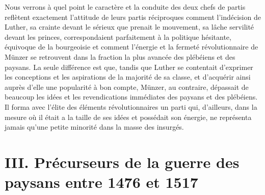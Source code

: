 \documentclass[french,twoside]{book} %
\newcommand\chapteropen{} %
\newcommand\chapterclose{} %
\begin{document}
Nous verrons à quel point le caractère et la conduite des deux chefs de partis reflètent exactement l’attitude de leurs partis réciproques comment l’indécision de Luther, sa crainte devant le sérieux que prenait le mouvement, sa lâche servilité devant les princes, correspondaient parfaitement à la politique hésitante, équivoque de la bourgeoisie et comment l’énergie et la fermeté révolutionnaire de Münzer se retrouvent dans la fraction la plus avancée des plébéiens et des paysans. La seule différence est que, tandis que Luther se contentait d’exprimer les conceptions et les aspirations de la majorité de sa classe, et d’acquérir ainsi auprès d’elle une popularité à bon compte, Münzer, au contraire, dépassait de beaucoup les idées et les revendications immédiates des paysans et des plébéiens. Il forma avec l’élite des éléments révolutionnaires un parti qui, d’ailleurs, dans la mesure où il était a la taille de ses idées et possédait son énergie, ne représenta jamais qu’une petite minorité dans la masse des insurgés.
\chapterclose


\chapteropen
\renewcommand{\leftmark}{III. Précurseurs de la guerre des paysans entre 1476 et 1517}
\chapter[III. Précurseurs de la guerre des paysans entre 1476 et 1517]{III. Précurseurs de la guerre des paysans entre 1476 et 1517}
\end{document}
